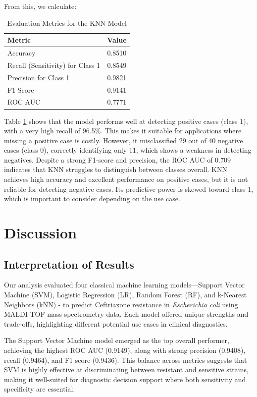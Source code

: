 \documentclass{article}
\begin{document}
From this, we calculate:

\begin{table}[h!]
\centering
\caption{Evaluation Metrics for the KNN Model}
\label{tab:evaluation_metrics_class1}
\begin{tabular}{|l|c|}
\hline
\textbf{Metric} & \textbf{Value} \\
\hline
Accuracy  & 0.8510 \\
Recall (Sensitivity) for Class 1 & 0.8549 \\
Precision for Class 1 & 0.9821 \\
F1 Score  & 0.9141 \\
ROC AUC   & 0.7771 \\
\hline
\end{tabular}
\end{table}

Table \ref{tab:evaluation_metrics_class1} shows that the model performs well at detecting positive cases (class 1), with a very high recall of 96.5\%. This makes it suitable for applications where missing a positive case is costly.
However, it misclassified 29 out of 40 negative cases (class 0), correctly identifying only 11, which shows a weakness in detecting negatives.
Despite a strong F1-score and precision, the ROC AUC of 0.709 indicates that KNN struggles to distinguish between classes overall.
KNN achieves high accuracy and excellent performance on positive cases, but it is not reliable for detecting negative cases. Its predictive power is skewed toward class 1, which is important to consider depending on the use case. \citep{ibm-knn}


\section{Discussion}

\subsection{Interpretation of Results}

Our analysis evaluated four classical machine learning models—Support Vector Machine (SVM), Logistic Regression (LR), Random Forest (RF), and k-Nearest Neighbors (kNN) - to predict Ceftriaxone resistance in \textit{Escherichia coli} using MALDI-TOF mass spectrometry data. Each model offered unique strengths and trade-offs, highlighting different potential use cases in clinical diagnostics.

The Support Vector Machine model emerged as the top overall performer, achieving the highest ROC AUC (0.9149), along with strong precision (0.9408), recall (0.9464), and F1 score (0.9436). This balance across metrics suggests that SVM is highly effective at discriminating between resistant and sensitive strains, making it well-suited for diagnostic decision support where both sensitivity and specificity are essential.
\end{document}
